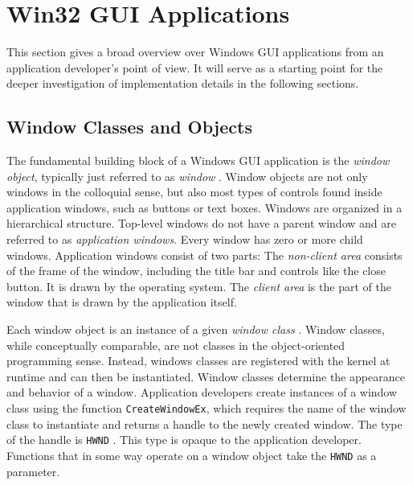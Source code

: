 	\section{Win32 GUI Applications}\label{sec:win32gui}
		This section gives a broad overview over Windows GUI applications from an
		application developer's point of view. It will serve as a starting point
		for the deeper investigation of implementation details in the following
		sections.

		\subsection{Window Classes and Objects}
			The fundamental building block of a Windows GUI application is the
			\textit{window object}, typically just referred to as \textit{window} \cite{whatiswindow}.
			Window objects are not only windows in the colloquial sense, but also
			most types of controls found inside application windows, such as buttons
			or text boxes. Windows are organized in a hierarchical structure.
			Top-level windows do not have a parent window and are referred to as
			\textit{application windows}. Every window has zero or more child
			windows. Application windows consist of two parts: The \textit{non-client
			area} consists of the frame of the window, including the title bar and
			controls like the close button. It is drawn by the operating system.
			The \textit{client area} is the part of the window that is drawn by
			the application itself.
			\cite{whatiswindow}

			Each window object is an instance of a given \textit{window class} \cite{creatingwindow}.
			Window classes, while conceptually comparable, are not classes in
			the object-oriented programming sense. Instead, windows classes are
			registered with the kernel at runtime and can then be instantiated.
			Window classes determine the appearance and behavior of a window.
			Application developers create instances of a window class
			using the function
			\texttt{CreateWindowEx}, which requires the name of the window class
			to instantiate and returns a handle to the newly created window.
			The type of the handle is \texttt{HWND} \cite{whatiswindow}. This type is opaque to the
			application developer. Functions that in some way operate on a
			window object take the \texttt{HWND} as a parameter.
			\cite{creatingwindow,whatiswindow}

